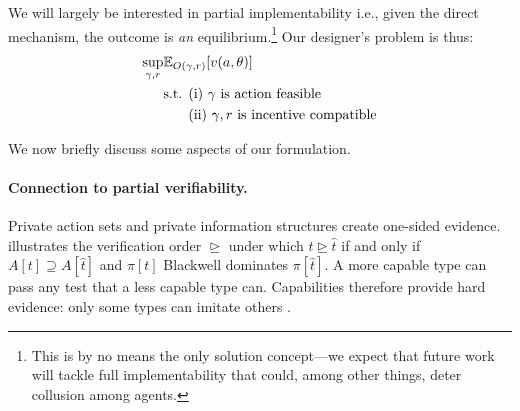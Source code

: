 \documentclass[12pt,reqno]{article}
\newcommand{\Ex}{\mathbb{E}}
\theoremstyle{definition} \newtheorem{example}{Example}
\theoremstyle{definition} \newtheorem{condition}{Condition}
\theoremstyle{definition} \newtheorem{corollary}{Corollary}
\theoremstyle{definition} \newtheorem{claim}{Claim}
\theoremstyle{definition} \newtheorem{definition}{Definition}
\theoremstyle{definition} \newtheorem{conjecture}{Conjecture}
\theoremstyle{definition} \newtheorem{Lemma}{Lemma}
\theoremstyle{definition} \newtheorem{lemma}{Lemma}
\theoremstyle{plain} \newtheorem{theorem}{Theorem}
\theoremstyle{definition} \newtheorem{assumption}{Assumption}
\theoremstyle{definition} \newtheorem*{assumptionnonumber}{Assumption}
\theoremstyle{definition} \newtheorem*{theoremNoNumber}{Proposition}
\theoremstyle{definition}\newtheorem{proposition}{Proposition}
\theoremstyle{definition} \newtheorem{observation}{Observation}
\theoremstyle{definition} \newtheorem*{definitionNoNumber}{Definition}
\theoremstyle{definition} \newtheorem{Definition}{Definition}
\theoremstyle{definition} \newtheorem*{DefinitionNoNumber}{Definition}
\theoremstyle{definition} \newtheorem*{fact}{Fact}
\theoremstyle{definition} \newtheorem*{property}{Property}
\theoremstyle{definition} \newtheorem{remark}{Remark}
\theoremstyle{definition}\newtheorem{romanexampleinner}{Example}
\begin{document}
We will largely be interested in partial implementability i.e., given the direct mechanism, the outcome is \emph{an} equilibrium.\footnote{This is by no means the only solution concept---we expect that future work will tackle full implementability that could, among other things, deter collusion among agents.} Our designer's problem is thus:  
\begin{align*}
\sup_{\gamma,r}& \Ex_{O(\gamma,r)} [v(a,\theta)] \\
&\text{s.t. (i) $\gamma$ is action feasible} \\
&\text{\phantom{s.t. }(ii) $\gamma,r$ is incentive compatible}
\end{align*}

We now briefly discuss some aspects of our formulation. 

\paragraph{Connection to partial verifiability.} Private action sets and private information structures create one-sided evidence.  illustrates the verification order $\trianglerighteq$ under which $t\trianglerighteq\hat t$ if and only if $A[t]\supseteq A[\hat t]$ and $\pi[t]$ Blackwell dominates $\pi[\hat t]$. A more capable type can pass any test that a less capable type can. Capabilities therefore provide hard evidence: only some types can imitate others \citep{green1986partially}.
\end{document}
